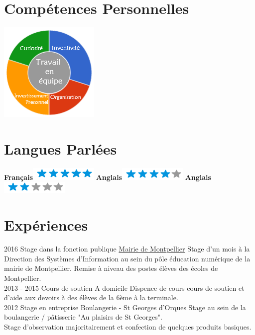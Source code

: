 \documentclass[]{friggeri-cv}
\begin{document}
\begin{aside}
  \section{Compétences Personnelles}
    \includegraphics[scale=0.75]{img/personal.png}
    ~
  \section{Langues Parlées}
    \textbf{Français}\includegraphics[scale=0.40]{img/5stars.png}
    \textbf{Anglais}\includegraphics[scale=0.40]{img/4stars.png}
    \textbf{Anglais}\includegraphics[scale=0.40]{img/2stars.png}
\end{aside}

\section{Expériences}
\begin{entrylist}
  \entry
    {2016}
    {Stage dans la fonction publique}
    {\href{http://www.montpellier.fr/}{Mairie de Montpellier}}
    {Stage d'un mois à la Direction des Systèmes d'Information au sein du pôle éducation numérique de la mairie de Montpellier. Remise à niveau des postes élèves des écoles de Montpellier.\\}
  \entry
    {2013 - 2015}
    {Cours de soutien}
    {A domicile}
    {Dispence de cours cours de soutien et d'aide aux devoirs à des élèves de la 6ème à la terminale.\\}
  \entry
    {2012}
    {Stage en entreprise}
    {Boulangerie - St Georges d'Orques}
    {Stage au sein de la boulangerie / pâtisserie "Au plaisirs de St Georges".\\Stage d'observation majoritairement et confection de quelques produits basiques.\\}
\end{entrylist}
\end{document}
